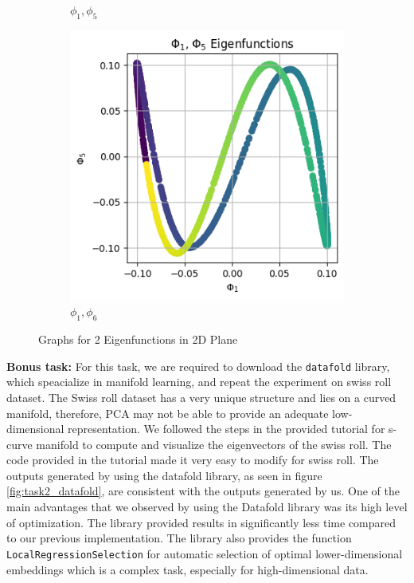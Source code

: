 \begin{figure}[H]
\begin{subfigure}{.25\textwidth}
        \caption{$\phi_1, \phi_5$}
    \end{subfigure}%
    \begin{subfigure}{.25\textwidth}
        \includegraphics[width=\linewidth]{images/ex3_task2_part3_2D_6.png}
        \caption{$\phi_1, \phi_6$}
    \end{subfigure}
    
    \caption{Graphs for 2 Eigenfunctions in 2D Plane}
    \label{fig:task2_3_2}
\end{figure}


\textbf{Bonus task:} For this task, we are required to download the \texttt{datafold} library, which speacialize in manifold learning, and repeat the experiment on swiss roll dataset. The Swiss roll dataset has a very unique structure and lies on a curved manifold, therefore, PCA may not be able to provide an adequate low-dimensional representation. We followed the steps in the provided tutorial for s-curve manifold to compute and visualize the eigenvectors of the swiss roll. The code provided in the tutorial made it very easy to modify for swiss roll. The outputs generated by using the datafold library, as seen in figure \ref{fig:task2_datafold}, are consistent with the outputs generated by us. One of the main advantages that we observed by using the Datafold library was its high level of optimization. The library provided results in significantly less time compared to our previous implementation. The library also provides the function \texttt{LocalRegressionSelection} for automatic selection of optimal lower-dimensional embeddings which is a complex task, especially for high-dimensional data.



